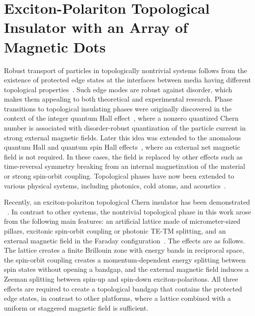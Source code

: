 \section{Exciton-Polariton Topological Insulator with an Array of Magnetic Dots}\label{Ch5}

Robust transport of particles in topologically nontrivial systems follows from the existence of protected edge states at the interfaces between media having different topological properties~\cite{Hasan:2010aa,Qi:2011hb,Chiu:2016aa}.
Such edge modes are robust against disorder, which makes them appealing to both theoretical and experimental research. Phase transitions to topological insulating phases were originally discovered in the context of the integer quantum Hall effect~\cite{Klitzing:1980aa}, where a nonzero quantized Chern number is associated with disorder-robust quantization of the particle current in strong external magnetic fields.
Later this idea was extended to the anomalous quantum Hall and quantum spin Hall effects~\cite{Haldane:1988aa, Kane:2005aa, Bernevig:2006aa, Konig:2007aa}, where an external net magnetic field is not required. In these cases, the field is replaced by other effects such as time-reversal symmetry breaking from an internal magnetization of the material~\cite{Karplus:1954aa, Chang:2013aa} or strong spin-orbit coupling. Topological phases have now been extended to various physical systems, including photonics, cold atoms, and acoustics~\cite{Wang2009,Jotzu:2014aa, Yang:2015aa}.

Recently, an exciton-polariton topological Chern insulator has been demonstrated ~\cite{Klembt:2018aa}. In contrast to other systems, the nontrivial topological phase in this work arose from the following main features: an artificial lattice made of micrometer-sized pillars, excitonic spin-orbit coupling or photonic TE-TM splitting, and an external magnetic field in the Faraday configuration~\cite{Bardyn:2015aa, Nalitov:2015aa}. The effects are as follows. The lattice creates a finite Brillouin zone with energy bands in reciprocal space, the spin-orbit coupling creates a momentum-dependent energy splitting between spin states without opening a bandgap, and the external magnetic field induces a Zeeman splitting between spin-up and spin-down exciton-polaritons. All three effects are required to create a topological bandgap that contains the protected edge states, in contrast to other platforms, where a lattice combined with a uniform or staggered magnetic field is sufficient.

